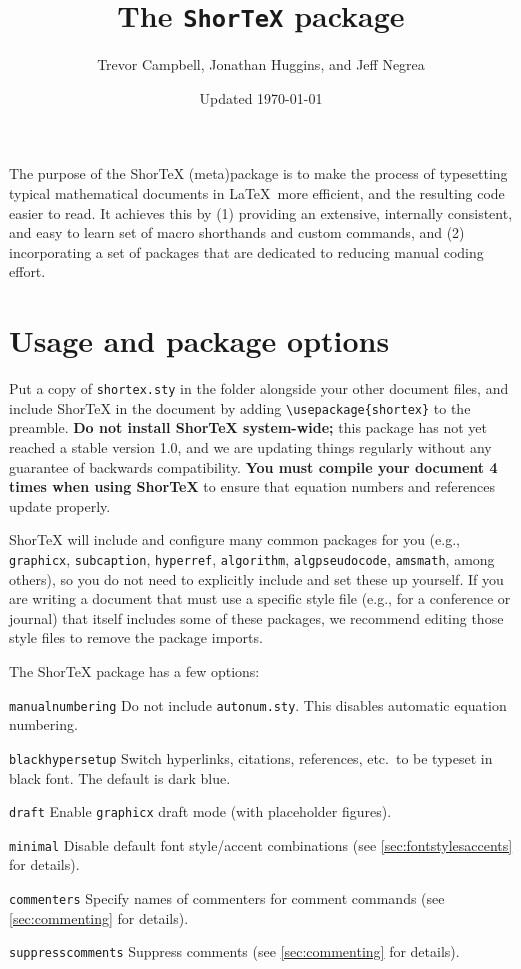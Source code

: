 \documentclass{article}
\title{The \texttt{ShorTeX} package}
\author{Trevor Campbell, Jonathan Huggins, and Jeff Negrea}
\date{Updated \today}
\begin{document}
\maketitle

\babs

The purpose of the ShorTeX (meta)package is to make the process of typesetting
typical mathematical documents in \LaTeX~more efficient, and the resulting
code easier to read.  It achieves this by 
(1) providing an
extensive, internally consistent, and easy to learn set of macro
shorthands and custom commands, and 
(2) incorporating a set of packages that are
dedicated to reducing manual coding effort.
\eabs


\tableofcontents

\section{Usage and package options}\label{sec:usage}

Put a copy of \texttt{shortex.sty} in the folder
alongside your other document files, and
include ShorTeX in the document by adding \verb!\usepackage{shortex}! to the preamble.
\textbf{Do not install ShorTeX system-wide;} this package has not yet reached a stable version 1.0,
and we are updating things regularly without any guarantee of backwards
compatibility. 
\textbf{You must compile your document 4 times when using ShorTeX} to ensure that equation
numbers and references update properly.


ShorTeX will include and configure many common packages for you (e.g., \texttt{graphicx}, \texttt{subcaption}, \texttt{hyperref},
\texttt{algorithm}, \texttt{algpseudocode}, \texttt{amsmath}, among others),
so you do not need to explicitly include and set these up yourself.
If you are writing a document that must use a specific style file (e.g., for a conference or journal) that itself
includes some of these packages, we recommend editing those style files to remove the package imports.

The ShorTeX package has a few options:
\bdesc
\item[\texttt{manualnumbering}] Do not include \texttt{autonum.sty}. This disables automatic equation numbering.
\item[\texttt{blackhypersetup}] Switch hyperlinks, citations, references, etc.~to be typeset in black font. The default is dark blue.
\item[\texttt{draft}] Enable \texttt{graphicx} draft mode (with placeholder figures).
\item[\texttt{minimal}] Disable default font style/accent combinations (see \cref{sec:fontstylesaccents} for details).
\item[\texttt{commenters}] Specify names of commenters for comment commands (see \cref{sec:commenting} for details).
\item[\texttt{suppresscomments}] Suppress comments (see \cref{sec:commenting} for details).
\edesc
\end{document}
